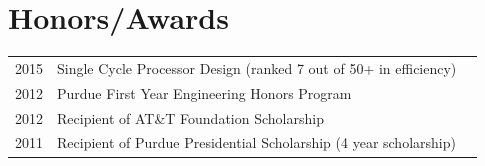 \documentclass[letterpaper]{deedy-resume} %
\begin{document}
\begin{minipage}[t]{0.66\textwidth}

\section{Honors/Awards} 

\begin{tabular}{rll}
2015 & Single Cycle Processor Design (ranked 7 out of 50+ in efficiency) \\
2012 & Purdue First Year Engineering Honors Program \\
2012 & Recipient of AT\&T Foundation Scholarship \\
2011 & Recipient of Purdue Presidential Scholarship (4 year scholarship) \\
\end{tabular}

\sectionsep %







\end{minipage} %




\end{document}
